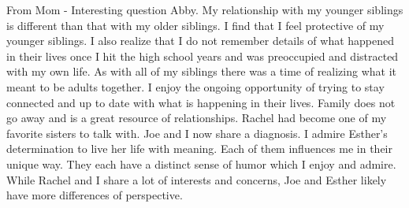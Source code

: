From Mom - Interesting question Abby.
My relationship with my younger siblings is different than that with my older siblings.
I find that I feel protective of my younger siblings.
I also realize that I do not remember details of what happened in their lives once I hit the high school years and was preoccupied and distracted with my own life.
As with all of my siblings there was a time of realizing what it meant to be adults together.
I enjoy the ongoing opportunity of trying to stay connected and up to date with what is happening in their lives.
Family does not go away and is a great resource of relationships.
Rachel had become one of my favorite sisters to talk with.
Joe and I now share a diagnosis.
I admire Esther's determination to live her life with meaning.
Each of them influences me in their unique way.
They each have a distinct sense of humor which I enjoy and admire.
While Rachel and I share a lot of interests and concerns, Joe and Esther likely have more differences of perspective.





